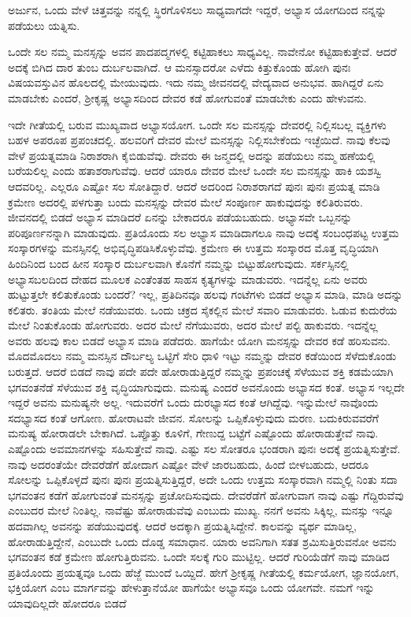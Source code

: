 \begin{artha}
ಅರ್ಜುನ, ಒಂದು ವೇಳೆ ಚಿತ್ತವನ್ನು ನನ್ನಲ್ಲಿ ಸ್ಥಿರಗೊಳಿಸಲು ಸಾಧ್ಯವಾಗದೇ ಇದ್ದರೆ, ಅಭ್ಯಾಸ ಯೋಗದಿಂದ ನನ್ನನ್ನು ಪಡೆಯಲು ಯತ್ನಿಸು.
\end{artha}

ಒಂದೇ ಸಲ ನಮ್ಮ ಮನಸ್ಸನ್ನು ಅವನ ಪಾದಪದ್ಮಗಳಲ್ಲಿ ಕಟ್ಟಿಹಾಕಲು ಸಾಧ್ಯವಿಲ್ಲ. ನಾವೇನೋ ಕಟ್ಟಿಹಾಕುತ್ತೇವೆ. ಆದರೆ ಅದಕ್ಕೆ ಬಿಗಿದ ದಾರ ತುಂಬ ದುರ್ಬಲವಾಗಿದೆ. ಆ ಮನಸ್ಸಾದರೋ ಎಳೆದು ಕಿತ್ತುಕೊಂಡು ಹೋಗಿ ಪುನಃ ವಿಷಯವಸ್ತುವಿನ ಹೊಲದಲ್ಲಿ ಮೇಯುವುದು. ಇದು ನಮ್ಮ ಜೀವನದಲ್ಲಿ ವೇದ್ಯವಾದ ಅನುಭವ. ಹಾಗಿದ್ದರೆ ಏನು ಮಾಡಬೇಕು ಎಂದರೆ, ಶ‍್ರೀಕೃಷ್ಣ ಅಭ್ಯಾಸದಿಂದ ದೇವರ ಕಡೆ ಹೋಗುವಂತೆ ಮಾಡಬೇಕು ಎಂದು ಹೇಳುವನು.

ಇದೇ ಗೀತೆಯಲ್ಲಿ ಬರುವ ಮುಖ್ಯವಾದ ಅಭ್ಯಾಸಯೋಗ. ಒಂದೇ ಸಲ ಮನಸ್ಸನ್ನು ದೇವರಲ್ಲಿ ನಿಲ್ಲಿಸಬಲ್ಲ ವ್ಯಕ್ತಿಗಳು ಬಹಳ ಅಪರೂಪ ಪ್ರಪಂಚದಲ್ಲಿ. ಹಲವರಿಗೆ ದೇವರ ಮೇಲೆ ಮನಸ್ಸನ್ನು ನಿಲ್ಲಿಸಬೇಕೆಂದು ಇಚ್ಛೆಯಿದೆ. ನಾವು ಕೆಲವು ವೇಳೆ ಪ್ರಯತ್ನಮಾಡಿ ನಿರಾಶರಾಗಿ ಕೈಬಿಡುವೆವು. ದೇವರು ಈ ಜನ್ಮದಲ್ಲಿ ಅದನ್ನು ಪಡೆಯಲು ನಮ್ಮ ಹಣೆಯಲ್ಲಿ ಬರೆಯಲಿಲ್ಲ ಎಂದು ಹತಾಶರಾಗುವೆವು. ಆದರೆ ಯಾರೂ ದೇವರ ಮೇಲೆ ಒಂದೇ ಸಲ ಮನಸ್ಸನ್ನು ಹಾಕಿ ಯಶಸ್ವಿ ಆದವರಿಲ್ಲ. ಎಲ್ಲರೂ ಎಷ್ಟೋ ಸಲ ಸೋತಿದ್ದಾರೆ. ಆದರೆ ಅದರಿಂದ ನಿರಾಶರಾಗದೆ ಪುನಃ ಪುನಃ ಪ್ರಯತ್ನ ಮಾಡಿ ಕ್ರಮೇಣ ಅದರಲ್ಲಿ ಪಳಗುತ್ತಾ ಬಂದು ಮನಸ್ಸನ್ನು ದೇವರ ಮೇಲೆ ಸಂಪೂರ್ಣ ಹಾಕುವುದನ್ನು ಕಲಿತಿರುವರು. ಜೀವನದಲ್ಲಿ ಬಿಡದೆ ಅಭ್ಯಾಸ ಮಾಡಿದರೆ ಏನನ್ನು ಬೇಕಾದರೂ ಪಡೆಯಬಹುದು. ಅಭ್ಯಾಸವೇ ಒಬ್ಬನನ್ನು ಪರಿಪೂರ್ಣನನ್ನಾಗಿ ಮಾಡುವುದು. ಪ್ರತಿಯೊಂದು ಸಲ ಅಭ್ಯಾಸ ಮಾಡಿದಾಗಲೂ ನಾವು ಅದಕ್ಕೆ ಸಂಬಂಧಪಟ್ಟ ಉತ್ತಮ ಸಂಸ್ಕಾರಗಳನ್ನು ಮನಸ್ಸಿನಲ್ಲಿ ಅಭಿವೃದ್ಧಿಪಡಿಸಿಕೊಳ್ಳುವೆವು. ಕ್ರಮೇಣ ಈ ಉತ್ತಮ ಸಂಸ್ಕಾರದ ಮೊತ್ತ ವೃದ್ಧಿಯಾಗಿ ಹಿಂದಿನಿಂದ ಬಂದ ಹೀನ ಸಂಸ್ಕಾರ ದುರ್ಬಲವಾಗಿ ಕೊನೆಗೆ ನಮ್ಮನ್ನು ಬಿಟ್ಟುಹೋಗುವುದು. ಸರ್ಕಸ್ಸಿನಲ್ಲಿ ಅಭ್ಯಾಸಬಲದಿಂದ ದೇಹದ ಮೂಲಕ ಎಂತೆಂತಹ ಸಾಹಸ ಕೃತ್ಯಗಳನ್ನು ಮಾಡುವರು. ಇದನ್ನೆಲ್ಲ ಏನು ಅವರು ಹುಟ್ಟುತ್ತಲೇ ಕಲಿತುಕೊಂಡು ಬಂದರೆ? ಇಲ್ಲ, ಪ್ರತಿದಿನವೂ ಹಲವು ಗಂಟೆಗಳು ಬಿಡದೆ ಅಭ್ಯಾಸ ಮಾಡಿ, ಮಾಡಿ ಅದನ್ನು ಕಲಿತರು. ತಂತಿಯ ಮೇಲೆ ನಡೆಯುವರು. ಒಂದು ಚಕ್ರದ ಸೈಕಲ್ಲಿನ ಮೇಲೆ ಸವಾರಿ ಮಾಡುವರು. ಓಡುವ ಕುದುರೆಯ ಮೇಲೆ ನಿಂತುಕೊಂಡು ಹೋಗುವರು. ಅದರ ಮೇಲೆ ನೆಗೆಯುವರು, ಅದರ ಮೇಲೆ ಪಲ್ಟಿ ಹಾಕುವರು. ಇದನ್ನೆಲ್ಲ ಅವರು ಹಲವು ಕಾಲ ಬಿಡದೆ ಅಭ್ಯಾಸ ಮಾಡಿ ಪಡೆದರು. ಹಾಗೆಯೇ ಯೋಗಿ ಮನಸ್ಸನ್ನು ದೇವರ ಕಡೆ ಹರಿಸುವನು. ಮೊದಮೊದಲು ನಮ್ಮ ಮನಸ್ಸಿನ ದೌರ್ಬಲ್ಯ ಒಟ್ಟಿಗೆ ಸೇರಿ ಧಾಳಿ ಇಟ್ಟು ನಮ್ಮನ್ನು ದೇವರ ಕಡೆಯಿಂದ ಸೆಳೆದುಕೊಂಡು ಬರುತ್ತದೆ. ಆದರೆ ಬಿಡದೆ ನಾವು ಪದೇ ಪದೇ ಹೋರಾಡುತ್ತಿದ್ದರೆ ನಮ್ಮನ್ನು ಪ್ರಪಂಚಕ್ಕೆ ಸೆಳೆಯುವ ಶಕ್ತಿ ಕಡಮೆಯಾಗಿ ಭಗವಂತನೆಡೆ ಸೆಳೆಯುವ ಶಕ್ತಿ ವೃದ್ಧಿಯಾಗುವುದು. ಮನುಷ್ಯ ಎಂದರೆ ಅವನೊಂದು ಅಭ್ಯಾಸದ ಕಂತೆ. ಅಭ್ಯಾಸ ಇಲ್ಲದೇ ಇದ್ದರೆ ಅವನು ಮನುಷ್ಯನೇ ಅಲ್ಲ. ಇದುವರೆಗೆ ಒಂದು ದುರಭ್ಯಾಸದ ಕಂತೆ ಆಗಿದ್ದೆವು. ಇನ್ನುಮೇಲೆ ನಾವೊಂದು ಸದಭ್ಯಾಸದ ಕಂತೆ ಆಗೋಣ. ಹೋರಾಟವೇ ಜೀವನ. ಸೋಲನ್ನು ಒಪ್ಪಿಕೊಳ್ಳುವುದು ಮರಣ. ಬದುಕಿರುವವರೆಗೆ ಮನುಷ್ಯ ಹೋರಾಡಲೇ ಬೇಕಾಗಿದೆ. ಒಪ್ಪೊತ್ತು ಕೂಳಿಗೆ, ಗೇಣುದ್ದ ಬಟ್ಟೆಗೆ ಎಷ್ಟೊಂದು ಹೋರಾಡುತ್ತೇವೆ ನಾವು. ಎಷ್ಟೊಂದು ಅವಮಾನಗಳನ್ನು ಸಹಿಸುತ್ತೇವೆ ನಾವು. ಎಷ್ಟು ಸಲ ಸೋತರೂ ಭಂಡರಾಗಿ ಪುನಃ ಅದಕ್ಕೆ ಪ್ರಯತ್ನಿಸುತ್ತೇವೆ. ನಾವು ಅದರಂತೆಯೇ ದೇವರೆಡೆಗೆ ಹೋದಾಗ ಎಷ್ಟೋ ವೇಳೆ ಜಾರಬಹುದು, ಹಿಂದೆ ಬೀಳಬಹುದು, ಆದರೂ ಸೋಲನ್ನು ಒಪ್ಪಿಕೊಳ್ಳದೆ ಪುನಃ ಪುನಃ ಪ್ರಯತ್ನಿಸುತ್ತಿದ್ದರೆ, ಅದೇ ಒಂದು ಉತ್ತಮ ಸಂಸ್ಕಾರವಾಗಿ ನಮ್ಮಲ್ಲಿ ನಿಂತು ಸದಾ ಭಗವಂತನ ಕಡೆಗೆ ಹೋಗುವಂತೆ ಮನಸ್ಸನ್ನು ಪ್ರಚೋದಿಸುವುದು. ದೇವರೆಡೆಗೆ ಹೋಗುವಾಗ ನಾವು ಎಷ್ಟು ಗೆದ್ದಿರುವೆವು ಎಂಬುದರ ಮೇಲೆ ನಿಂತಿಲ್ಲ. ನಾವೆಷ್ಟು ಹೋರಾಡುವೆವು ಎಂಬುದು ಮುಖ್ಯ. ನನಗೆ ಅವನು ಸಿಕ್ಕಿಲ್ಲ, ಮನಸ್ಸು ಇನ್ನೂ ಹದವಾಗಿಲ್ಲ ಅವನನ್ನು ಪಡೆಯುವುದಕ್ಕೆ. ಆದರೆ ಅದಕ್ಕಾಗಿ ಪ್ರಯತ್ನಿಸಿದ್ದೇನೆ. ಕಾಲವನ್ನು ವ್ಯರ್ಥ ಮಾಡಿಲ್ಲ, ಹೋರಾಡುತ್ತಿದ್ದೇನೆ, ಎಂಬುದೇ ಒಂದು ದೊಡ್ಡ ಸಮಾಧಾನ. ಯಾರು ಅವನಿಗಾಗಿ ಸತತ ಶ್ರಮಿಸುತ್ತಿರುವನೋ ಅವನು ಭಗವಂತನ ಕಡೆ ಕ್ರಮೇಣ ಹೋಗುತ್ತಿರುವನು. ಒಂದೇ ಸಲಕ್ಕೆ ಗುರಿ ಮುಟ್ಟಿಲ್ಲ. ಆದರೆ ಗುರಿಯೆಡೆಗೆ ನಾವು ಮಾಡಿದ ಪ್ರತಿಯೊಂದು ಪ್ರಯತ್ನವೂ ಒಂದು ಹೆಜ್ಜೆ ಮುಂದೆ ಒಯ್ದಿದೆ. ಹೇಗೆ ಶ‍್ರೀಕೃಷ್ಣ ಗೀತೆಯಲ್ಲಿ ಕರ್ಮಯೋಗ, ಜ್ಞಾನಯೋಗ, ಭಕ್ತಿಯೋಗ ಎಂಬ ಮಾರ್ಗವನ್ನು ಹೇಳುತ್ತಾನೆಯೋ ಹಾಗೆಯೇ ಅಭ್ಯಾಸವೂ ಒಂದು ಯೋಗವೇ. ನಮಗೆ ಇನ್ನು ಯಾವುದಿಲ್ಲದೇ ಹೋದರೂ ಬಿಡದೆ 